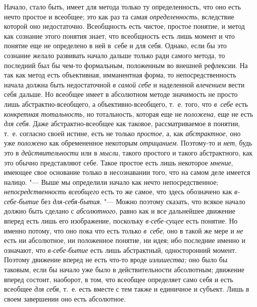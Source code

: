 Начало, стало быть, имеет для метода только ту определенность, что оно
есть нечто простое и всеобщее; это как раз та самая {\em определенность},
вследствие которой оно недостаточно. Всеобщность есть чистое,
простое понятие, и метод как сознание этого понятия знает, что всеобщность
есть лишь момент и что понятие еще не определено в ней в~себе и для себя.
Однако, если бы это сознание желало развивать начало дальше только ради
самого метода, то последний был бы чем-то формальным, положенным во внешней
рефлексии. На так как метод есть объективная, имманентная форма, то
непосредственность начала должна быть недостаточной
{\em в самой себе} и наделенной {\em влечением}
вести себя дальше. Но всеобщее имеет в абсолютном методе
значимость не просто лишь абстрактно-всеобщего, а объективно-всеобщего,
т.~е. того, что {\em в~себе} есть {\em конкретная
тотальность}, но тотальность, которая еще не
{\em положена}, еще не есть {\em для себя}. Даже
абстрактно-всеобщее как таковое, рассматриваемое в понятии, т.~е. согласно
своей истине, есть не только {\em простое}, а, как {\em абстрактное}, оно
уже {\em положено} как обремененное некоторым {\em отрицанием}.
Поэтому-то и {\em нет}, будь это в {\em действительности} или в {\em мысли},
такого простого и такого абстрактного, как это обычно
представляют себе. Такое простое есть лишь некоторое {\em мнение}, имеющее
свое основание только в несознавании того, что на самом деле имеется
налицо. "--- Выше мы определили начало как нечто непосредственное;
{\em непосредственность всеобщего}
есть то же самое, что здесь обозначено как
{\em в-себе-бытие} без {\em для-себя-бытия}. "--- Можно поэтому
сказать, что всякое начало должно быть сделано с {\em абсолютного},
равно как и все дальнейшее движение вперед есть лишь его
изображение, поскольку {\em в-себе-сущее} есть
понятие. Но именно потому, что оно пока что есть только
{\em в~себе}, оно в такой же мере и {\em не} есть
ни абсолютное, ни положенное понятие, ни идея; ибо последние именно и
означают, что {\em в-себе-бытие}
есть лишь абстрактный, односторонний момент. Поэтому движение
вперед не есть что-то вроде {\em излишества;} оно
было бы таковым, если бы начало уже было в действительности абсолютным;
движение вперед состоит, наоборот, в том, что всеобщее определяет само себя
и есть всеобщее {\em для себя},
т.~е. есть вместе с тем также и единичное и субъект. Лишь в
своем завершении оно есть абсолютное.


